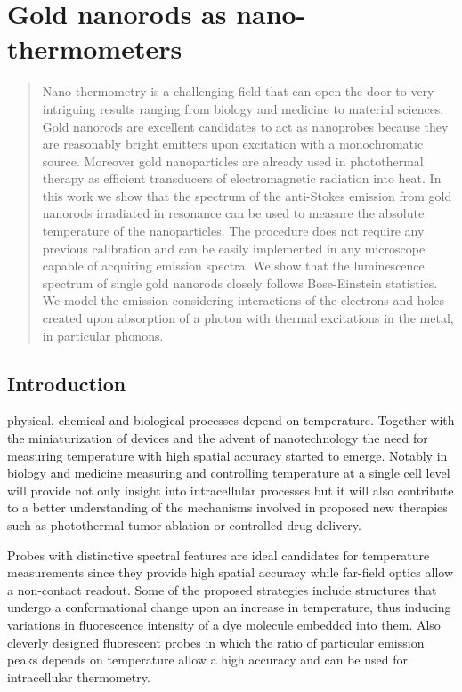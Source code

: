 \chapter{Gold nanorods as nano-thermometers}
\label{ch:AntiStokes}

\begin{abstract}
Nano-thermometry is a challenging field that can open the door to very
intriguing results ranging from biology and medicine to material sciences. Gold
nanorods are excellent candidates to act as nanoprobes because they are
reasonably bright emitters upon excitation with a monochromatic source.
Moreover gold nanoparticles are already used in photothermal therapy as efficient
transducers of electromagnetic radiation into heat. In this work we show that
the spectrum of the anti-Stokes emission from gold nanorods irradiated in
resonance can be used to measure the absolute temperature of the nanoparticles.
The procedure does not require any previous calibration and can be easily
implemented in any microscope capable of acquiring emission spectra. We show
that the luminescence spectrum of single gold nanorods closely follows
Bose-Einstein statistics. We model the emission considering interactions of the
electrons and holes created upon absorption of a photon with thermal excitations
in the metal, in particular phonons.
\end{abstract}

\newpage

\section{Introduction}
 physical, chemical and biological processes depend on
temperature. Together with the miniaturization of devices and the advent of
nanotechnology the need for measuring temperature with high spatial accuracy
started to emerge. Notably in biology\cite{Yang2011a,Hrelescu2010} and
medicine\cite{Li2013c} measuring and controlling temperature at a single cell
level will provide not only insight into intracellular processes but it will
also contribute to a better understanding of the mechanisms involved in proposed
new therapies such as photothermal tumor ablation\cite{Gobin2007} or controlled
drug delivery\cite{Huang2006,Huo2014}.

Probes with distinctive spectral features are ideal candidates for temperature
measurements since they provide high spatial accuracy while far-field optics
allow a non-contact readout. Some of the proposed strategies include structures
that undergo a conformational change upon an increase in
temperature\cite{Ebrahimi2014}, thus inducing variations in fluorescence
intensity of a dye molecule embedded into them. Also cleverly designed
fluorescent probes\cite{Vetrone2010} in which the ratio of particular emission
peaks depends on temperature allow a high accuracy and can be used for
intracellular thermometry.

